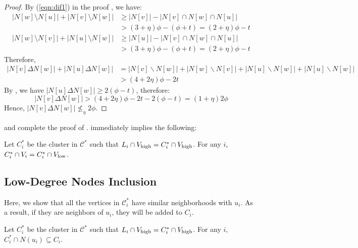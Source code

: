 \begin{proof}
By (\ref{eqn:dif1}) in the proof , we have:
\begin{align*}
|N[w] \setminus N[u]| + |N[v] \setminus N[w]| &\geq |N[v]| - |N[v] \cap N[w] \cap N[u]|  \\
& > (3+\eta) \phi - (\phi + t) = (2+\eta)\phi - t \\
|N[w] \setminus N[v]| + |N[u] \setminus N[w]| &\geq |N[u]| - |N[v] \cap N[w] \cap N[u]|  \\
&> (3+\eta) \phi - (\phi + t) = (2+\eta)\phi - t
\end{align*}
Therefore, 
\begin{align*}
|N[v] \Delta N[w]| + |N[u] \Delta N[w]| &= |N[v] \backslash N[w]| + |N[w] \backslash N[v]| + |N[u] \backslash N[w]| + |N[u] \backslash N[w]| \\
&> (4+2\eta)\phi - 2t
\end{align*}
By , we have $|N[u] \Delta N[w]| \geq 2(\phi - t) $, therefore:
$$|N[v] \Delta N[w]| > (4+2\eta)\phi - 2t - 2(\phi - t) = (1+\eta)2\phi$$
Hence, $|N[v] \Delta N[w]| \nleq_{\eta} 2\phi$.
\end{proof}
 and  complete the proof of .  immediately implies the following:
\begin{corollary}\label{cor:nostealing}
Let $C^{*}_i$ be the cluster in $\mathcal{C}^{*}$ such that $L_i \cap V_{\operatorname{high}} = {C}^{*}_{i} \cap  V_{\operatorname{high}}$. For any $i$, $C^{*}_i \cap V_i = C^{*}_i \cap V_{\operatorname{low}}$.
\end{corollary}
\subsection{Low-Degree Nodes Inclusion}
Here, we show that all the vertices in $\mathcal{C}^{*}_i$ have similar neighborhoods with $u_i$. As a result, if they are neighbors of $u_i$, they will be added to $C_i$. 
\begin{lemma}\label{lem:inclusion} Let $C^{*}_i$ be the cluster in $\mathcal{C}^{*}$ such that $L_i \cap V_{\operatorname{high}} = {C}^{*}_{i} \cap V_{\operatorname{high}}$. For any $i$, $C^{*}_i \cap N(u_i) \subseteq C_i$. 
\end{lemma}

